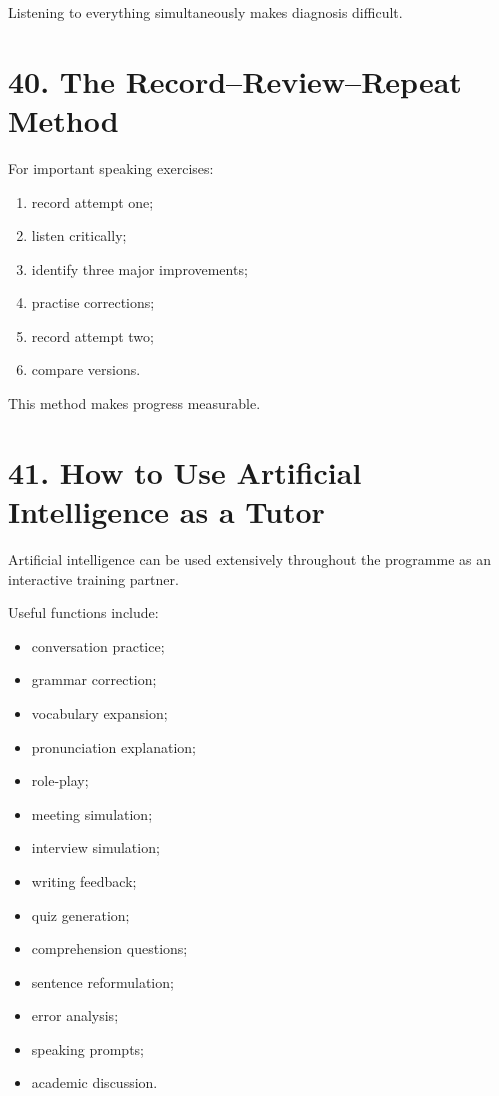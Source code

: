 Listening to everything simultaneously makes diagnosis difficult.

\section*{40. The Record--Review--Repeat Method}

For important speaking exercises:

\begin{enumerate}
    \item record attempt one;
    \item listen critically;
    \item identify three major improvements;
    \item practise corrections;
    \item record attempt two;
    \item compare versions.
\end{enumerate}

This method makes progress measurable.

\section*{41. How to Use Artificial Intelligence as a Tutor}

Artificial intelligence can be used extensively throughout the programme as an interactive training partner.

Useful functions include:

\begin{itemize}
    \item conversation practice;
    \item grammar correction;
    \item vocabulary expansion;
    \item pronunciation explanation;
    \item role-play;
    \item meeting simulation;
    \item interview simulation;
    \item writing feedback;
    \item quiz generation;
    \item comprehension questions;
    \item sentence reformulation;
    \item error analysis;
    \item speaking prompts;
    \item academic discussion.
\end{itemize}

